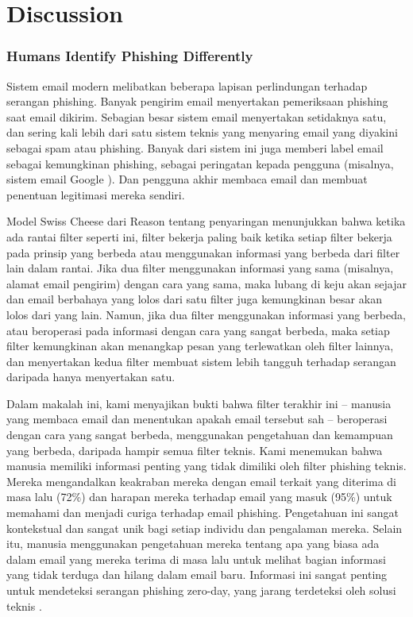\documentclass[lettersize,journal]{IEEEtran}
\begin{document}
\section{Discussion}

\subsubsection{Humans Identify Phishing Differently}
Sistem email modern melibatkan beberapa lapisan perlindungan terhadap serangan
phishing. Banyak pengirim email menyertakan pemeriksaan phishing saat email
dikirim. Sebagian besar sistem email menyertakan setidaknya satu, dan sering
kali lebih dari satu sistem teknis yang menyaring email yang diyakini sebagai
spam atau phishing. Banyak dari sistem ini juga memberi label email sebagai
kemungkinan phishing, sebagai peringatan kepada pengguna (misalnya, sistem
email Google \cite{dualima}). Dan pengguna akhir membaca email dan membuat
penentuan legitimasi mereka sendiri.

Model Swiss Cheese dari Reason tentang penyaringan \cite{duadelapan}
menunjukkan bahwa ketika ada rantai filter seperti ini, filter bekerja paling
baik ketika setiap filter bekerja pada prinsip yang berbeda atau menggunakan
informasi yang berbeda dari filter lain dalam rantai. Jika dua filter
menggunakan informasi yang sama (misalnya, alamat email pengirim) dengan cara
yang sama, maka lubang di keju akan sejajar dan email berbahaya yang lolos dari
satu filter juga kemungkinan besar akan lolos dari yang lain. Namun, jika dua
filter menggunakan informasi yang berbeda, atau beroperasi pada informasi
dengan cara yang sangat berbeda, maka setiap filter kemungkinan akan menangkap
pesan yang terlewatkan oleh filter lainnya, dan menyertakan kedua filter
membuat sistem lebih tangguh terhadap serangan daripada hanya menyertakan satu.

Dalam makalah ini, kami menyajikan bukti bahwa filter terakhir ini – manusia
yang membaca email dan menentukan apakah email tersebut sah – beroperasi dengan
cara yang sangat berbeda, menggunakan pengetahuan dan kemampuan yang berbeda,
daripada hampir semua filter teknis. Kami menemukan bahwa manusia memiliki
informasi penting yang tidak dimiliki oleh filter phishing teknis. Mereka
mengandalkan keakraban mereka dengan email terkait yang diterima di masa lalu
(72\%) dan harapan mereka terhadap email yang masuk (95\%) untuk memahami dan
menjadi curiga terhadap email phishing. Pengetahuan ini sangat kontekstual dan
sangat unik bagi setiap individu dan pengalaman mereka. Selain itu, manusia
menggunakan pengetahuan mereka tentang apa yang biasa ada dalam email yang
mereka terima di masa lalu untuk melihat bagian informasi yang tidak terduga
dan hilang dalam email baru. Informasi ini sangat penting untuk mendeteksi
serangan phishing zero-day, yang jarang terdeteksi oleh solusi teknis
\cite{satudua}.
\end{document}
